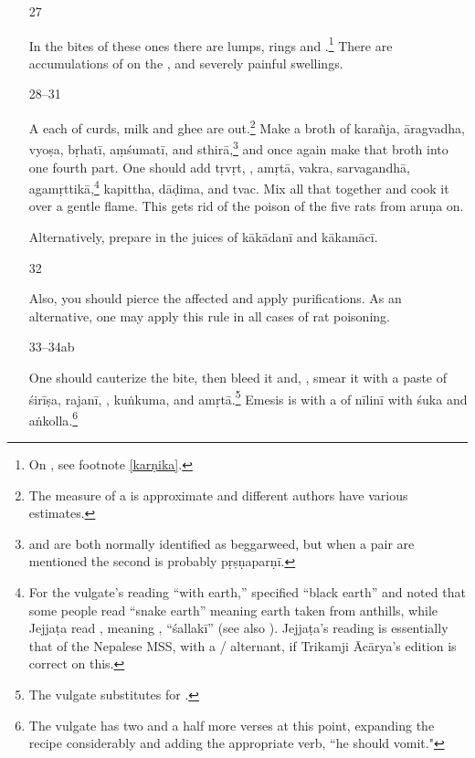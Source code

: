 \begin{translation}
\begin{itemize}
\item[27]

In the bites of these ones there are lumps, rings and
.\footnote{On , see footnote
    \ref{karṇika}.}  There are accumulations of  on the 
    , and severely painful swellings.

\item[28--31]    
    
A  each of curds, milk and ghee are
 out.\footnote{The measure of a  is
    approximate and different authors have various estimates.} Make a
    broth of \gls{karañja}, \gls{āragvadha}, \gls{vyoṣa}, \gls{bṛhatī},
    \gls{aṃśumatī}, and \gls{sthirā},\footnote{ and
         are both normally identified as beggarweed, but when a
        pair are mentioned the second is probably \gls{pṛṣṇaparṇī}.} and once
    again make that broth into one fourth part. %
    One should add    \gls{tṛvṛt}, , \gls{amṛtā},
    \gls{vakra}, \gls{sarvagandhā}, \gls{agamṛttikā},\footnote{For the
        vulgate's reading  “with earth,” 
        specified “black earth” and noted that some people read
         “snake earth” meaning earth taken from anthills,
        while Jejjaṭa read , meaning ,
        “\gls{śallakī}”  (see also \cite[392]{gvdb}). Jejjaṭa's reading is
        essentially that of the Nepalese MSS, with a /
        alternant, if Trikamji Ācārya's edition is correct on this.} %
        \gls{kapittha}, \gls{dāḍima}, and \gls{tvac}. Mix all that together
        and cook it over a gentle flame.
This gets rid of the poison of the five rats from \Gls{aruṇa} on.

Alternatively, prepare in the juices of \gls{kākādanī} and \gls{kākamācī}.



\item[32]

Also, you should pierce the affected  and apply purifications.
As an alternative, one may apply this rule in all cases of rat poisoning.

\item[33--34ab]

One should cauterize the bite, then bleed it and,
, smear it with a paste of
\gls{śirīṣa}, \gls{rajanī}, , \gls{kuṅkuma}, and
\gls{amṛtā}.\footnote{The vulgate substitutes  for
    .} Emesis is with a  of \gls{nīlinī}
    with \gls{śuka} and \gls{aṅkolla}.\footnote{The vulgate has two and a
        half more verses at this point, expanding the recipe considerably and
        adding the appropriate verb, “he should vomit."}


\end{itemize}
\end{translation}
